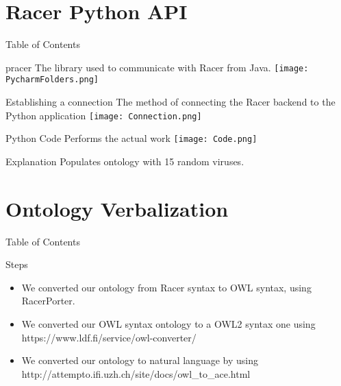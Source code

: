 \documentclass{beamer}
\begin{document}
\section{Racer Python API}
\begin{frame}{Table of Contents}
    \tableofcontents[currentsection]
\end{frame}

\begin{frame}{pracer}
    The library used to communicate with Racer from Java.
    \texttt{[image: PycharmFolders.png]}
\end{frame}

\begin{frame}{Establishing a connection}
    The method of connecting the Racer backend to the Python application
    \texttt{[image: Connection.png]}
\end{frame}

\begin{frame}{Python Code}
    Performs the actual work
    \texttt{[image: Code.png]}
    \begin{block}{Explanation}
        Populates ontology with 15 random viruses.
    \end{block}
\end{frame}

\section{Ontology Verbalization}
\begin{frame}{Table of Contents}
    \tableofcontents[currentsection]
\end{frame}

\begin{frame}{Steps}
   \begin{itemize}
    \item We converted our ontology from Racer syntax to OWL syntax, using RacerPorter.
    \item We converted our OWL syntax ontology to a OWL2 syntax one using https://www.ldf.fi/service/owl-converter/
    \item We converted our ontology to natural language by using http://attempto.ifi.uzh.ch/site/docs/owl\_to\_ace.html
    \end{itemize}
\end{frame}
\end{document}
